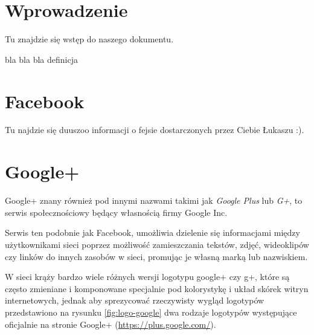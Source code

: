 
\section{Wprowadzenie}
\label{sec:wprowadzenie}

Tu znajdzie się wstęp do naszego dokumentu.

\begin{defn}
bla bla bla definicja
\end{defn}


\clearpage

\section{Facebook}
\label{sec:facebook}
Tu najdzie się duuszoo informacji o fejsie dostarczonych przez Ciebie Łukaszu :).


\clearpage

\section{Google+}
\label{sec:google-plus}
Google+ znany również pod innymi nazwami takimi jak \emph{Google Plus} lub \emph{G+}, to serwis społecznościowy będący własnością firmy Google Inc.

Serwis ten podobnie jak Facebook, umożliwia dzielenie się informacjami między użytkownikami sieci poprzez możliwość zamieszczania tekstów, zdjęć, wideoklipów czy linków do innych zasobów w sieci, promując je własną marką lub nazwiskiem.

W sieci krąży bardzo wiele różnych wersji logotypu google+ czy g+, które są często zmieniane i komponowane specjalnie pod kolorystykę i układ skórek witryn internetowych, jednak aby sprezycować rzeczywisty wygląd logotypów przedstawiono na rysunku \ref{fig:logo-google} dwa rodzaje logotypów występujące oficjalnie na stronie Google+ (\url{https://plus.google.com/}).

